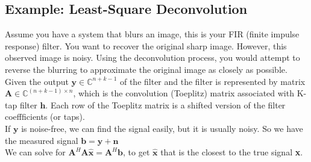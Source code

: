 \subsection{Example: Least-Square Deconvolution}
Assume you have a system that blurs an image, this is your FIR (finite impulse response) filter. You want to recover the original sharp image. However, this observed image is noisy. Using the deconvolution process, you would attempt to reverse the blurring to approximate the original image as closely as possible.\\

Given the output $\textbf{y}\in \mathbb{C}^{n+k-1}$ of the filter and the filter is represented by matrix $\textbf{A} \in \mathbb{C}^{(n+k-1)\times n}$, which is the convolution (Toeplitz) matrix associated with K-tap filter $\textbf{h}$. Each row of the Toeplitz matrix is a shifted version of the filter coeffficients (or taps).\\

If $\textbf{y}$ is noise-free, we can find the signal easily, but it is usually noisy. So we have the measured signal $\textbf{b} = \textbf{y}+\textbf{n}$ \\

We can solve for $\textbf{A}^H \textbf{A}\hat{\textbf{x}} = \textbf{A}^H\textbf{b}$, to get $\hat{\textbf{x}}$ that is the closest to the true signal \textbf{x}.

